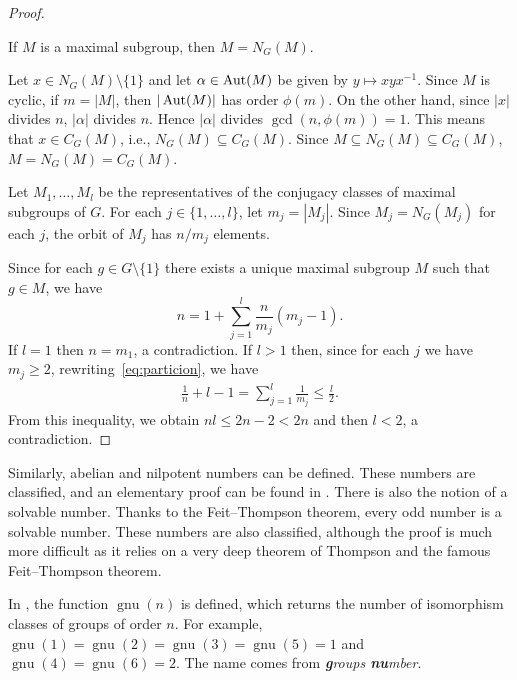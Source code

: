 \begin{proof}
    \begin{claim}
    If $M$ is a maximal subgroup, then $M=N_G(M)$.
    \end{claim}

    Let $x\in N_G(M)\setminus\{1\}$ and let $\alpha\in\operatorname{Aut}(M)$ be given by $y\mapsto xyx^{-1}$. Since $M$ is cyclic, if $m=|M|$, then $|\operatorname{Aut}(M)|$ has order $\phi(m)$. On the other hand, since $|x|$ divides $n$, $|\alpha|$ divides $n$. Hence $|\alpha|$ divides $\gcd(n,\phi(m))=1$. This means that $x\in C_G(M)$, i.e., $N_G(M)\subseteq C_G(M)$. Since $M\subseteq N_G(M)\subseteq C_G(M)$, $M=N_G(M)=C_G(M)$.

    Let $M_1,\dots,M_l$ be the representatives of the conjugacy classes of maximal subgroups of $G$. For each $j\in\{1,\dots,l\}$, let $m_j=|M_j|$. Since $M_{j}=N_G(M_j)$ for each $j$, the orbit of $M_j$ has $n/m_j$ elements.

    Since for each $g\in G\setminus\{1\}$ there exists a unique maximal subgroup $M$ such that $g\in M$, we have
    \begin{equation}
    \label{eq:particion}
    n=1+\sum_{j=1}^l \frac{n}{m_j}(m_j-1).
    \end{equation}
    If $l=1$ then $n=m_1$, a contradiction. If $l>1$ then, since for each $j$ we have $m_j\geq2$, rewriting~\eqref{eq:particion}, we have
    \begin{align*}
    \frac{1}{n}+l-1=\sum_{j=1}^l\frac{1}{m_j}\leq\frac{l}{2}.
    \end{align*}
    From this inequality, we obtain $nl\leq 2n-2<2n$ and then $l<2$, a contradiction. 
\end{proof}

Similarly, abelian and nilpotent numbers can be defined. These numbers are classified, and an elementary proof can be found in \cite{MR1786236}. There is also the notion of a solvable number. Thanks to the Feit--Thompson theorem, every odd number is a solvable number. These numbers are also classified, although the proof is much more difficult as it relies on a very deep theorem of Thompson and the famous Feit--Thompson theorem.

\medskip
In \cite{MR2410121}, the function $\operatorname{gnu}(n)$ is defined, which returns the number of isomorphism classes of groups of order $n$. For example, $\operatorname{gnu}(1)=\operatorname{gnu}(2)=\operatorname{gnu}(3)=\operatorname{gnu}(5)=1$ and $\operatorname{gnu}(4)=\operatorname{gnu}(6)=2$. The name comes from \emph{\textbf{g}roups \textbf{nu}mber}.

